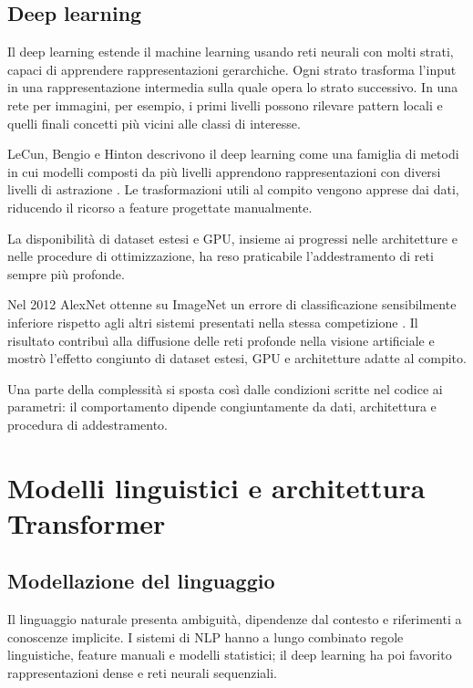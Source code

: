\subsection{Deep learning}

Il deep learning estende il machine learning usando reti neurali con molti
strati, capaci di apprendere rappresentazioni gerarchiche. Ogni strato trasforma
l'input in una rappresentazione intermedia sulla quale opera lo strato
successivo. In una rete per immagini, per esempio, i primi livelli possono
rilevare pattern locali e quelli finali concetti più vicini alle classi di
interesse.

LeCun, Bengio e Hinton descrivono il deep learning come una famiglia di metodi in
cui modelli composti da più livelli apprendono rappresentazioni con diversi
livelli di astrazione \cite{lecunDeepLearning}. Le trasformazioni utili al compito
vengono apprese dai dati, riducendo il ricorso a feature progettate manualmente.

La disponibilità di dataset estesi e GPU, insieme ai progressi nelle architetture
e nelle procedure di ottimizzazione, ha reso praticabile l'addestramento di reti
sempre più profonde.

Nel 2012 AlexNet ottenne su ImageNet un errore di classificazione sensibilmente
inferiore rispetto agli altri sistemi presentati nella stessa competizione
\cite{krizhevskyImageNet}. Il risultato contribuì alla diffusione delle reti
profonde nella visione artificiale e mostrò l'effetto congiunto di dataset estesi,
GPU e architetture adatte al compito.

Una parte della complessità si sposta così dalle condizioni scritte nel codice ai
parametri: il comportamento dipende congiuntamente da dati, architettura e
procedura di addestramento.

\section{Modelli linguistici e architettura Transformer}

\subsection{Modellazione del linguaggio}

Il linguaggio naturale presenta ambiguità, dipendenze dal contesto e riferimenti a
conoscenze implicite. I sistemi di NLP hanno a lungo combinato
regole linguistiche, feature manuali e modelli statistici; il deep learning ha
poi favorito rappresentazioni dense e reti neurali sequenziali.

